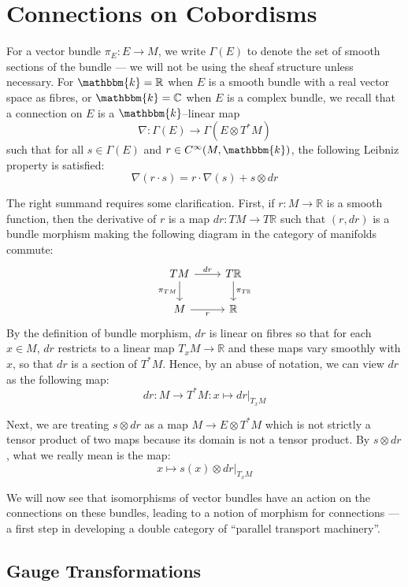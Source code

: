 \documentclass{amsart}
\newcommand{\R}{\mathbb{R}}
\newcommand{\C}{\mathbb{C}}
\newcommand{\K}{\mathbbm{k}}
\newcommand{\tensor}{\otimes}
\renewcommand{\to}[1][]{\stackrel{#1}{\longrightarrow}}
\renewcommand{\mapsto}{\longmapsto}
\newcommand{\Cinf}{C^{\infty}}
\numberwithin{thm}{section}
\theoremstyle{definition}
\begin{document}
%

\section{Connections on Cobordisms}

For a vector bundle $\pi_E : E \to M$, we write $\Gamma(E)$ to denote the set of
smooth sections of the bundle --- we will not be using the sheaf structure unless
necessary. For $\K = \R$ when $E$ is a smooth bundle with a real vector space as
fibres, or $\K = \C$ when $E$ is a complex bundle, we recall that a connection
on $E$ is a $\K$--linear map
\[
  \nabla : \Gamma(E) \to \Gamma(E \tensor T^*M)
\]
such that for all $s \in \Gamma(E)$ and $r \in \Cinf(M, \K)$, the following
Leibniz property is satisfied:
\[
  \nabla(r \cdot s) = r \cdot \nabla(s) + s \tensor dr
\]

The right summand requires some clarification.
First, if $r : M \to \R$ is a smooth function, then the derivative of $r$ is a
map $dr : TM \to T\R$ such that $(r, dr)$ is a bundle morphism making the
following diagram in the category of manifolds commute:
\[\begin{tikzcd}
TM \ar[d, "\pi_{TM}" left] \ar[r, "dr" above] & T\R \ar[d, "\pi_{T\R}" right]\\
M \ar[r, "r" below] & \R
\end{tikzcd}\]
By the definition of bundle morphism, $dr$ is linear on fibres so that for each
$x \in M$, $dr$ restricts to a linear map $T_xM \to \R$ and these maps vary
smoothly with $x$, so that $dr$ is a section of $T^*M$. Hence, by an abuse of
notation, we can view $dr$ as the following map:
\[
  dr : M \to T^*M : x \mapsto dr|_{T_xM}
\]

Next, we are treating $s \tensor dr$ as a map $M \to E \tensor T^*M$ which is
not strictly a tensor product of two maps because its domain is not a tensor
product. By $s \tensor dr$, what we really mean is the map:
\begin{equation}\label{eqn:conn_tensor}
  x \mapsto s(x) \tensor dr|_{T_xM}
\end{equation}

We will now see that isomorphisms of vector bundles have an action on the
connections on these bundles, leading to a notion of morphism for connections
--- a first step in developing a double category of
``parallel transport machinery''.

% 

\subsection{Gauge Transformations}
\end{document}
